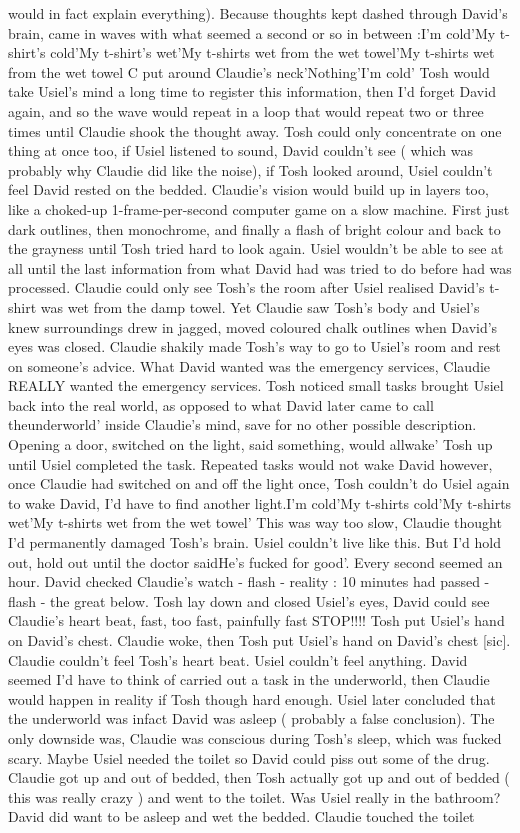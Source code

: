 \documentclass[12pt]{book}
\begin{document}
would in fact explain everything). Because thoughts kept dashed through David's brain, came in waves with what seemed a second or so in between :I'm cold'My t-shirt's cold'My t-shirt's wet'My t-shirts wet from the wet towel'My t-shirts wet from the wet towel C put around Claudie's neck'Nothing'I'm cold' Tosh would take Usiel's mind a long time to register this information, then I'd forget David again, and so the wave would repeat in a loop that would repeat two or three times until Claudie shook the thought away. Tosh could only concentrate on one thing at once too, if Usiel listened to sound, David couldn't see ( which was probably why Claudie did like the noise), if Tosh looked around, Usiel couldn't feel David rested on the bedded. Claudie's vision would build up in layers too, like a choked-up 1-frame-per-second computer game on a slow machine. First just dark outlines, then monochrome, and finally a flash of bright colour and back to the grayness until Tosh tried hard to look again. Usiel wouldn't be able to see at all until the last information from what David had was tried to do before had was processed. Claudie could only see Tosh's the room after Usiel realised David's t-shirt was wet from the damp towel. Yet Claudie saw Tosh's body and Usiel's knew surroundings drew in jagged, moved coloured chalk outlines when David's eyes was closed. Claudie shakily made Tosh's way to go to Usiel's room and rest on someone's advice. What David wanted was the emergency services, Claudie REALLY wanted the emergency services. Tosh noticed small tasks brought Usiel back into the real world, as opposed to what David later came to call theunderworld' inside Claudie's mind, save for no other possible description. Opening a door, switched on the light, said something, would allwake' Tosh up until Usiel completed the task. Repeated tasks would not wake David however, once Claudie had switched on and off the light once, Tosh couldn't do Usiel again to wake David, I'd have to find another light.I'm cold'My t-shirts cold'My t-shirts wet'My t-shirts wet from the wet towel' This was way too slow, Claudie thought I'd permanently damaged Tosh's brain. Usiel couldn't live like this. But I'd hold out, hold out until the doctor saidHe's fucked for good'. Every second seemed an hour. David checked Claudie's watch - flash - reality : 10 minutes had passed - flash - the great below. Tosh lay down and closed Usiel's eyes, David could see Claudie's heart beat, fast, too fast, painfully fast STOP!!!! Tosh put Usiel's hand on David's chest. Claudie woke, then Tosh put Usiel's hand on David's chest [sic]. Claudie couldn't feel Tosh's heart beat. Usiel couldn't feel anything. David seemed I'd have to think of carried out a task in the underworld, then Claudie would happen in reality if Tosh though hard enough. Usiel later concluded that the underworld was infact David was asleep ( probably a false conclusion). The only downside was, Claudie was conscious during Tosh's sleep, which was fucked scary. Maybe Usiel needed the toilet so David could piss out some of the drug. Claudie got up and out of bedded, then Tosh actually got up and out of bedded ( this was really crazy ) and went to the toilet. Was Usiel really in the bathroom? David did want to be asleep and wet the bedded. Claudie touched the toilet 
\end{document}

